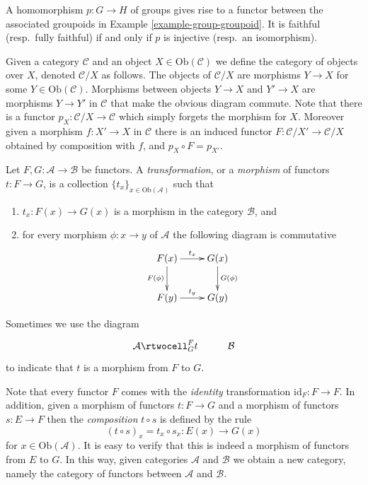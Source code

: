\begin{example}
\label{example-group-homorphism-functor}
A homomorphism $p\colon G\to H$ of groups gives rise to a functor
between the associated groupoids in Example \ref{example-group-groupoid}. It is
faithful (resp.\ fully faithful) if and only if $p$ is injective (resp.\ an
isomorphism).
\end{example}

\begin{example}
\label{example-comma-category}
Given a category $\mathcal{C}$ and an object $X\in \text{Ob}(\mathcal{C})$
we define the category of objects over $X$, denoted $\mathcal{C}/X$ as follows.
The objects of $\mathcal{C}/X$ are morphisms $Y\to X$ for
some $Y\in \text{Ob}(\mathcal{C})$. Morphisms between objects
$Y\to X$ and $Y'\to X$ are morphisms $Y\to Y'$ in $\mathcal{C}$ that
make the obvious diagram commute.  Note that there is a functor
$p_X\colon \mathcal{C}/X\to \mathcal{C}$ which simply forgets the
morphism for $X$.  Moreover given a morphism $f\colon X'\to X$ in
$\mathcal{C}$ there is an induced functor 
$F\colon \mathcal{C}/X' \to \mathcal{C}/X$ obtained by composition with $f$,
and $p_X\circ F = p_{X'}$.
\end{example}

\begin{definition}
Let $F, G : \mathcal{A} \to \mathcal{B}$ be functors.
A {\it transformation}, or a {\it morphism} of functors
$t : F \to G$, is a collection $\{t_x\}_{x\in \text{Ob}(\mathcal{A})}$
such that
\begin{enumerate}
\item $t_x : F(x) \to G(x)$ is a morphism in the category $\mathcal{B}$, and
\item for every morphism $\phi : x \to y$ of $\mathcal{A}$ the following
diagram is commutative
$$
\xymatrix{
F(x) \ar[r]^{t_x} \ar[d]_{F(\phi)} & G(x) \ar[d]^{G(\phi)} \\
F(y) \ar[r]^{t_y} & G(y) }
$$
\end{enumerate}
\end{definition}

\noindent
Sometimes we use the diagram
$$
\xymatrix{
\mathcal{A}
\rtwocell^F_{G}{t}
&
\mathcal{B}
}
$$
to indicate that $t$ is a morphism from $F$ to $G$.

\medskip\noindent
Note that every functor $F$ comes with the {\it identity} transformation
$\text{id}_F : F \to F$. In addition, given a morphism of
functors $t : F \to G$ and a morphism of functors $s : E \to F$
then the {\it composition} $t \circ s$ is defined by the rule
$$
(t \circ s)_x = t_x \circ s_x : E(x) \to G(x)
$$
for $x \in \text{Ob}(\mathcal{A})$.
It is easy to verify that this is indeed a morphism of functors
from $E$ to $G$.
In this way, given categories 
$\mathcal{A}$ and $\mathcal{B}$ we obtain a new category,
namely the category of functors between $\mathcal{A}$ and
$\mathcal{B}$.

